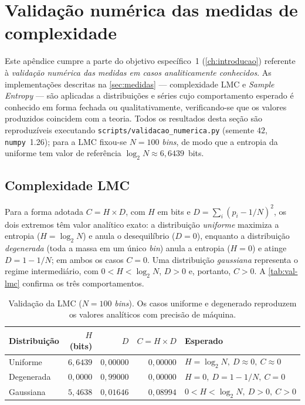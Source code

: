 
\chapter{Validação numérica das medidas de complexidade}
\label{ap:validacao-numerica}

Este apêndice cumpre a parte do objetivo específico~1
(\autoref{ch:introducao}) referente à \emph{validação numérica das medidas
em casos analiticamente conhecidos}. As implementações descritas na
\autoref{sec:medidas} --- complexidade LMC e \emph{Sample Entropy} ---
são aplicadas a distribuições e séries cujo comportamento esperado é conhecido
em forma fechada ou qualitativamente, verificando-se que os valores produzidos
coincidem com a teoria. Todos os resultados desta seção são reproduzíveis
executando \texttt{scripts/validacao\_numerica.py} (semente $42$,
\texttt{numpy}~1.26); para a LMC fixou-se $N = 100$ \emph{bins}, de modo que a
entropia da uniforme tem valor de referência $\log_2 N \approx 6{,}6439$~bits.

\section{Complexidade LMC}
\label{sec:ap-validacao-lmc}

Para a forma adotada $C = H \times D$, com $H$ em bits e
$D = \sum_i (p_i - 1/N)^2$, os dois extremos têm valor analítico exato: a
distribuição \emph{uniforme} maximiza a entropia ($H = \log_2 N$) e anula o
desequilíbrio ($D = 0$), enquanto a distribuição \emph{degenerada} (toda a massa
em um único \emph{bin}) anula a entropia ($H = 0$) e atinge
$D = 1 - 1/N$; em ambos os casos $C = 0$. Uma distribuição \emph{gaussiana}
representa o regime intermediário, com $0 < H < \log_2 N$, $D > 0$ e,
portanto, $C > 0$. A \autoref{tab:val-lmc} confirma os três comportamentos.

\begin{table}[H]
  \centering
  \caption{Validação da LMC ($N = 100$ \emph{bins}). Os casos uniforme e
  degenerado reproduzem os valores analíticos com precisão de máquina.}
  \label{tab:val-lmc}
  \begin{tabular}{lrrrl}
    \toprule
    Distribuição & $H$ (bits) & $D$ & $C = H\times D$ & Esperado \\
    \midrule
    Uniforme            & $6{,}6439$ & $0{,}00000$ & $0{,}00000$ & $H=\log_2 N,\ D\approx0,\ C\approx0$ \\
    Degenerada          & $0{,}0000$ & $0{,}99000$ & $0{,}00000$ & $H=0,\ D=1-1/N,\ C=0$ \\
    Gaussiana           & $5{,}4638$ & $0{,}01646$ & $0{,}08994$ & $0<H<\log_2 N,\ D>0,\ C>0$ \\
    \bottomrule
  \end{tabular}
\end{table}

